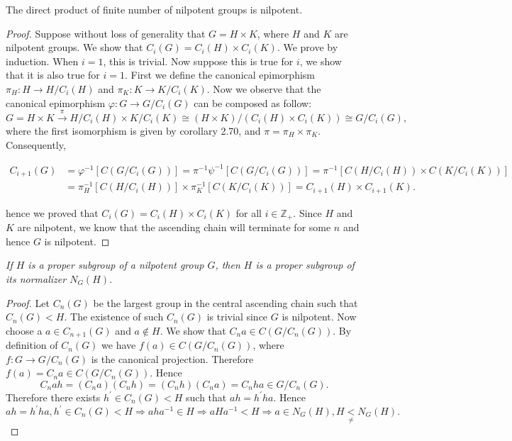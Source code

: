 \begin{theorem}
The direct product of finite number of nilpotent groups is nilpotent.
\end{theorem}
\begin{proof}
Suppose without loss of generality that $G=H\times K$, where $H$ and $K$ are nilpotent groups. We show that $C_i(G)=C_i(H)\times C_i(K)$. We prove by induction. When $i=1$, this is trivial. Now suppose this is true for $i$, we show that it is also true for $i=1$. First we define the canonical epimorphism $\pi_H:H\to H/C_i(H)$ and $\pi_K:K\to K/C_i(K)$. Now we observe that the canonical epimorphism $\varphi:G\to G/C_i(G)$ can be composed as follow:
$$
G=H\times K\overset{\pi}{\longrightarrow}H/C_i\left( H \right) \times K/C_i\left( K \right) \cong \left( H\times K \right) /\left( C_i\left( H \right) \times C_i\left( K \right) \right) \cong G/C_i\left( G \right) ,
$$
where the first isomorphism is given by corollary 2.70, and $\pi=\pi_H\times\pi_K$. Consequently, 
\begin{small}
$$
\begin{aligned}
C_{i+1}\left( G \right) &=\varphi ^{-1}\left[ C\left( G/C_i\left( G \right) \right) \right] =\pi ^{-1}\psi ^{-1}\left[ C\left( G/C_i\left( G \right) \right) \right] =\pi ^{-1}\left[ C\left( H/C_i\left( H \right) \right) \times C\left( K/C_i\left( K \right) \right) \right] 
\\
&=\pi _{H}^{-1}\left[ C\left( H/C_i\left( H \right) \right) \right] \times \pi _{K}^{-1}\left[ C\left( K/C_i\left( K \right) \right) \right] =C_{i+1}\left( H \right) \times C_{i+1}\left( K \right) .
\end{aligned}
$$    
\end{small}
hence we proved that $C_i(G)=C_i(H)\times C_i(K)$ for all $i\in\mathbb{Z}_+$. Since $H$ and $K$ are nilpotent, we know that the ascending chain will terminate for some $n$ and hence $G$ is nilpotent.
\end{proof}
\begin{lemma}\em
If $H$ is a proper subgroup of a nilpotent group $G$, then $H$ is a proper subgroup of its normalizer $N_G(H)$.
\end{lemma}
\begin{proof}
Let $C_n(G)$ be the largest group in the central ascending chain such that $C_n(G)<H$. The existence of such $C_n(G)$ is trivial since $G$ is nilpotent. Now choose a $a\in C_{n+1}(G)$ and $a\notin H$. We show that $C_na\in C(G/C_n(G))$. By definition of $C_n(G)$ we have $f\left( a \right) \in C\left( G/C_n\left( G \right) \right) $, where $f:G\rightarrow G/C_n\left( G \right) $ is the canonical projection. Therefore $f\left( a \right) =C_na\in C\left( G/C_n\left( G \right) \right) $. Hence 
$$
C_nah=\left( C_na \right) \left( C_nh \right) =\left( C_nh \right) \left( C_na \right) =C_nha\in G/C_n\left( G \right) .
$$
Therefore there exists $h^\prime\in C_n(G)<H$ such that $ah=h^{\prime}ha$. Hence 
$$
ah=h^{\prime}ha,h^{\prime}\in C_n\left( G \right) <H\Rightarrow aha^{-1}\in H\Rightarrow aHa^{-1}<H\Rightarrow a\in N_G\left( H \right) ,H\underset{\ne}{<}N_G\left( H \right) .
$$
\end{proof}
